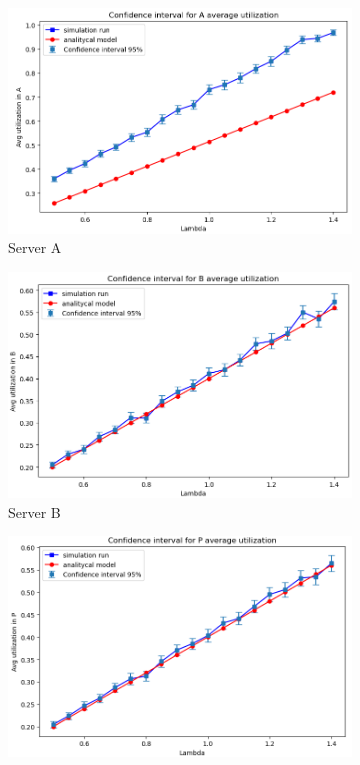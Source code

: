 \begin{figure}
    \centering
    \begin{subfigure}{0.49\linewidth}
        \centering
        \includegraphics[width=\columnwidth]{figs/results/obj4/obj4-utilizzazione-A.png}
        \caption{Server A}
        \label{fig:obj4_line_utilization_A}
    \end{subfigure} 
    \begin{subfigure}{0.49\linewidth}
        \centering
         \includegraphics[width=\columnwidth]{figs/results/obj4/obj4-utilizzazione-B.png}
        \caption{Server B}
        \label{fig:obj4_line_utilization_B}
    \end{subfigure}
    \begin{subfigure}{0.5\linewidth}
        \centering
        \includegraphics[width=\columnwidth]{figs/results/obj4/obj4-utilizzazione-P.png}

\end{subfigure}
\end{figure}
